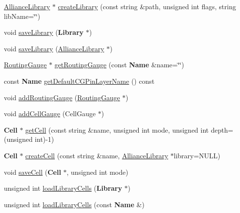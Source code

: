 \begin{DoxyCompactItemize}
\item 
\hyperlink{classCRL_1_1AllianceLibrary}{Alliance\-Library} $\ast$ \hyperlink{classCRL_1_1AllianceFramework_a4efc06e6a6d5413398946453c3fd6649}{create\-Library} (const string \&path, unsigned int flags, string lib\-Name=\char`\"{}\char`\"{})
\item 
void \hyperlink{classCRL_1_1AllianceFramework_a5e5a3d137a2c141bf8984877b7f7d18a}{save\-Library} ({\bf Library} $\ast$)
\item 
void \hyperlink{classCRL_1_1AllianceFramework_afe7a103d54e865511fd55af90eddcf4e}{save\-Library} (\hyperlink{classCRL_1_1AllianceLibrary}{Alliance\-Library} $\ast$)
\item 
\hyperlink{classCRL_1_1RoutingGauge}{Routing\-Gauge} $\ast$ \hyperlink{classCRL_1_1AllianceFramework_ae102d655820c5d0a29a0200c5e83d42c}{get\-Routing\-Gauge} (const {\bf Name} \&name=\char`\"{}\char`\"{})
\item 
const {\bf Name} \hyperlink{classCRL_1_1AllianceFramework_aa584786d09bbb2469923a181b6f8e0d4}{get\-Default\-C\-G\-Pin\-Layer\-Name} () const 
\item 
void \hyperlink{classCRL_1_1AllianceFramework_ae182fd150c695fd24c1b10ddbc377b32}{add\-Routing\-Gauge} (\hyperlink{classCRL_1_1RoutingGauge}{Routing\-Gauge} $\ast$)
\item 
void \hyperlink{classCRL_1_1AllianceFramework_aab16db33a0ce2e3bce5739f7cadb3d5a}{add\-Cell\-Gauge} (Cell\-Gauge $\ast$)
\item 
{\bf Cell} $\ast$ \hyperlink{classCRL_1_1AllianceFramework_a5f0b56b303c51af5ea5c1eb1096786dd}{get\-Cell} (const string \&name, unsigned int mode, unsigned int depth=(unsigned int)-\/1)
\item 
{\bf Cell} $\ast$ \hyperlink{classCRL_1_1AllianceFramework_ac4381ad0c3799d584ef3ea160846e2bb}{create\-Cell} (const string \&name, \hyperlink{classCRL_1_1AllianceLibrary}{Alliance\-Library} $\ast$library=N\-U\-L\-L)
\item 
void \hyperlink{classCRL_1_1AllianceFramework_abb34a606c7cd21638b4439701a8dcef9}{save\-Cell} ({\bf Cell} $\ast$, unsigned int mode)
\item 
unsigned int \hyperlink{classCRL_1_1AllianceFramework_a2e43b1928a05eea4b2dc1fe0757e4865}{load\-Library\-Cells} ({\bf Library} $\ast$)
\item 
unsigned int \hyperlink{classCRL_1_1AllianceFramework_adc8acedeb9daa37b4ab2dee0717835fa}{load\-Library\-Cells} (const {\bf Name} \&)
\end{DoxyCompactItemize}
